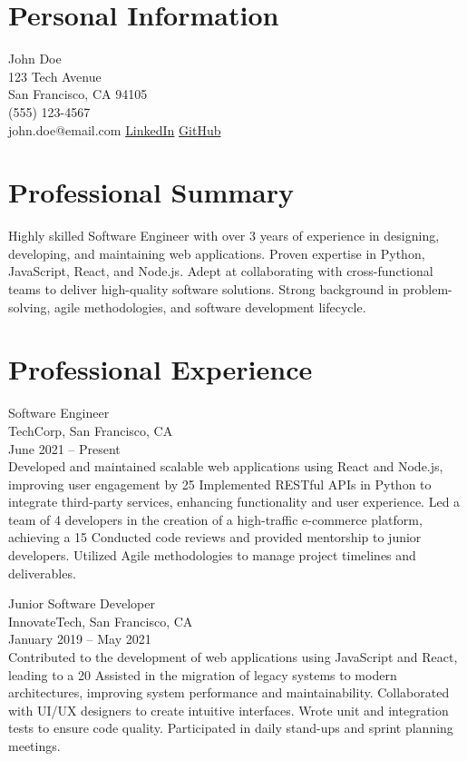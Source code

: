 \documentclass[10pt]{article}
\begin{document}
\section{Personal Information}
 John Doe \\
123 Tech Avenue \\
San Francisco, CA 94105 \\
(555) 123-4567 \\
john.doe@email.com \href{linkedin.com/in/johndoe}{LinkedIn} \href{github.com/johndoe}{GitHub}

\section{Professional Summary}
Highly skilled Software Engineer with over 3 years of experience in designing, developing, and maintaining web applications. Proven expertise in Python, JavaScript, React, and Node.js. Adept at collaborating with cross-functional teams to deliver high-quality software solutions. Strong background in problem-solving, agile methodologies, and software development lifecycle.

\section{Professional Experience}
 Software Engineer \\
TechCorp, San Francisco, CA \\
June 2021 – Present \\
Developed and maintained scalable web applications using React and Node.js, improving user engagement by 25%
Implemented RESTful APIs in Python to integrate third-party services, enhancing functionality and user experience.
Led a team of 4 developers in the creation of a high-traffic e-commerce platform, achieving a 15%
Conducted code reviews and provided mentorship to junior developers.
Utilized Agile methodologies to manage project timelines and deliverables.

 Junior Software Developer \\
InnovateTech, San Francisco, CA \\
January 2019 – May 2021 \\
Contributed to the development of web applications using JavaScript and React, leading to a 20%
Assisted in the migration of legacy systems to modern architectures, improving system performance and maintainability.
Collaborated with UI/UX designers to create intuitive interfaces.
Wrote unit and integration tests to ensure code quality.
Participated in daily stand-ups and sprint planning meetings.
\end{document}
